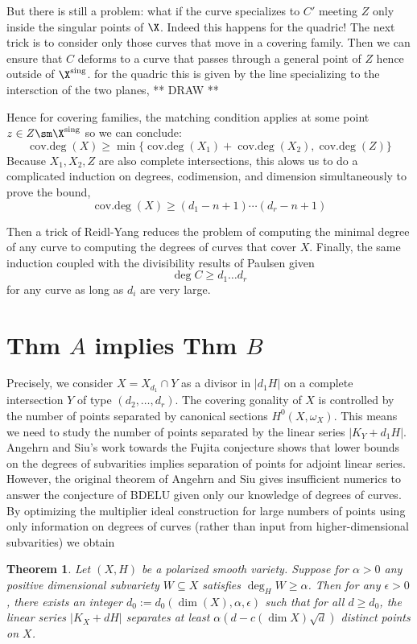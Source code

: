 \documentclass[12pt]{article}
\DeclareMathOperator{\covdeg}{\text{cov.deg}}
\theoremstyle{plain}
\newtheorem{Lthm}{Theorem}
\begin{document}
But there is still a problem: what if the curve specializes to $C'$ meeting $Z$ only inside the singular points of $\X$. Indeed this happens for the quadric! The next trick is to consider only those curves that move in a covering family. Then we can ensure that $C$ deforms to a curve that passes through a general point of $Z$ hence outside of $\X^{\text{sing}}$. {\color{red} for the quadric this is given by the line specializing to the intersction of the two planes, ** DRAW **}
\par 
Hence for covering families, the matching condition applies at some point $z \in Z \sm \X^{\text{sing}}$ so we can conclude:
\[ \covdeg(X) \ge \min \{ \covdeg(X_1) + \covdeg(X_2), \covdeg(Z) \} \]
Because $X_1, X_2, Z$ are also complete intersections, this alows us to do a complicated induction on degrees, codimension, and dimension simultaneously to prove the bound,
\[ \covdeg(X) \ge (d_1 - n + 1) \cdots (d_r - n + 1) \]

Then a trick of Reidl-Yang reduces the problem of computing the minimal degree of any curve to computing the degrees of curves that cover $X$. Finally, the same induction coupled with the divisibility results of Paulsen given
\[ \deg{C} \ge d_1 \dots d_r \]
for any curve as long as $d_i$ are very large.


\section{Thm $A$ implies Thm $B$}

Precisely, we consider $X = X_{d_1} \cap Y$ as a divisor in $|d_1 H|$ on a complete intersection  $Y$ of type $(d_2, \dots, d_{r})$. The covering gonality of $X$ is controlled by the number of points separated by canonical sections $H^0(X, \omega_X)$. This means we need to study the number of points separated by the linear series $|K_Y + d_1 H|$. Angehrn and
Siu's work towards the Fujita conjecture shows that lower bounds on the degrees of subvarities implies separation of points for adjoint linear series. However, the original theorem of Angehrn and Siu gives insufficient numerics to answer the conjecture of BDELU given only our knowledge of degrees of curves. By optimizing the multiplier ideal construction for large numbers of points using only information on degrees of curves (rather than input from higher-dimensional subvarities) we obtain

\newcommand{\reg}{\mathrm{reg}}

\begin{Lthm}
Let $(X, H)$ be a polarized smooth variety. Suppose for $\alpha > 0$ any positive dimensional subvariety $W \subseteq X$ satisfies $\deg_H{W} \ge \alpha$. Then for any $\epsilon > 0$, there exists an integer $d_0 := d_0(\dim(X), \alpha, \epsilon)$ such that for all $d \ge d_0$, the linear series $|K_X + d H|$ separates at least  $\alpha (d - c(\dim{X}) \sqrt{d})$ distinct points on $X$. 
\end{Lthm}
\end{document}
